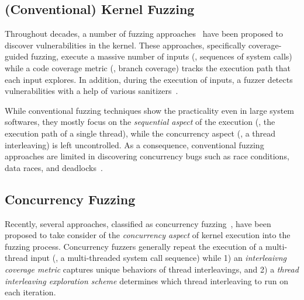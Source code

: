 
\subsection{(Conventional) Kernel Fuzzing}
\label{ss:kernelfuzzing}

Throughout decades, a number of fuzzing approaches~\cite{imf,
  syzkaller, moonshine, hfl, healer, janus, hydra, trinity} have been
proposed to discover vulnerabilities in the kernel.
%
These approaches, specifically coverage-guided fuzzing, execute a
massive number of inputs (\ie, sequences of system calls) while a code
coverage metric (\eg, branch coverage) tracks the execution path that
each input explores.
%
In addition, during the execution of inputs, a fuzzer detects
vulnerabilities with a help of various sanitizers~\cite{meds, kasan,
  asan, ubsan, lockdep}.


While conventional fuzzing techniques show the practicality even in
large system softwares, they mostly focus on the \textit{sequential
  aspect} of the execution (\ie, the execution path of a single
thread), while the concurrency aspect (\ie, a thread interleaving) is
left uncontrolled.
%
As a consequence, conventional fuzzing approaches are limited in
discovering concurrency bugs such as race conditions, data races, and
deadlocks~\cite{covcon, terragni2018effectiveness}.





\subsection{Concurrency Fuzzing}
\label{ss:concurrencyfuzzing}





Recently, several approaches, classified as concurrency
fuzzing~\cite{razzer, krace, snowboard, muzz, conzzer}, have been
proposed to take consider of the \textit{concurrency aspect} of kernel
execution into the fuzzing process.
%
Concurrency fuzzers generally repeat the execution of a multi-thread
input (\eg, a multi-threaded system call sequence) while
%
1) an \textit{interleaivng coverage metric} captures unique behaviors
of thread interleavings, and
%
2) a \textit{thread interleaving exploration scheme} determines
which thread interleaving to run on each iteration.


